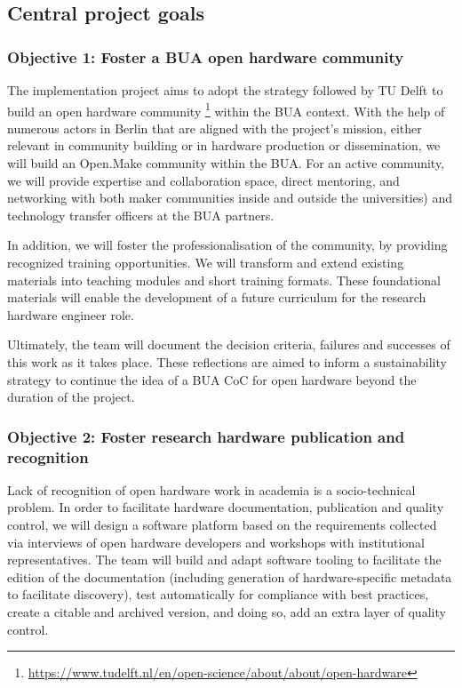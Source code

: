 \documentclass[
  12pt,
  a4paper,
]{article}
\begin{document}
\hypertarget{central-project-goals}{%
\subsection{Central project goals}\label{central-project-goals}}

\hypertarget{objective-1-foster-a-bua-open-hardware-community}{%
\subsubsection{Objective 1: Foster a BUA open hardware
community}\label{objective-1-foster-a-bua-open-hardware-community}}

The implementation project aims to adopt the strategy followed by TU
Delft to build an open hardware community \footnote{\url{https://www.tudelft.nl/en/open-science/about/about/open-hardware}}
within the BUA context. With the help of numerous actors in Berlin that
are aligned with the project's mission, either relevant in community
building or in hardware production or dissemination, we will build an
Open.Make community within the BUA. For an active community, we will
provide expertise and collaboration space, direct mentoring, and
networking with both maker communities inside and outside the
universities) and technology transfer officers at the BUA partners.

In addition, we will foster the professionalisation of the community, by
providing recognized training opportunities. We will transform and
extend existing materials into teaching modules and short training
formats. These foundational materials will enable the development of a
future curriculum for the research hardware engineer role.

Ultimately, the team will document the decision criteria, failures and
successes of this work as it takes place. These reflections are aimed to
inform a sustainability strategy to continue the idea of a BUA CoC for
open hardware beyond the duration of the project.

\hypertarget{objective-2-foster-research-hardware-publication-and-recognition}{%
\subsubsection{Objective 2: Foster research hardware publication and
recognition}\label{objective-2-foster-research-hardware-publication-and-recognition}}

Lack of recognition of open hardware work in academia is a
socio-technical problem. In order to facilitate hardware documentation,
publication and quality control, we will design a software platform
based on the requirements collected via interviews of open hardware
developers and workshops with institutional representatives. The team
will build and adapt software tooling to facilitate the edition of the
documentation (including generation of hardware-specific metadata to
facilitate discovery), test automatically for compliance with best
practices, create a citable and archived version, and doing so, add an
extra layer of quality control.
\end{document}
